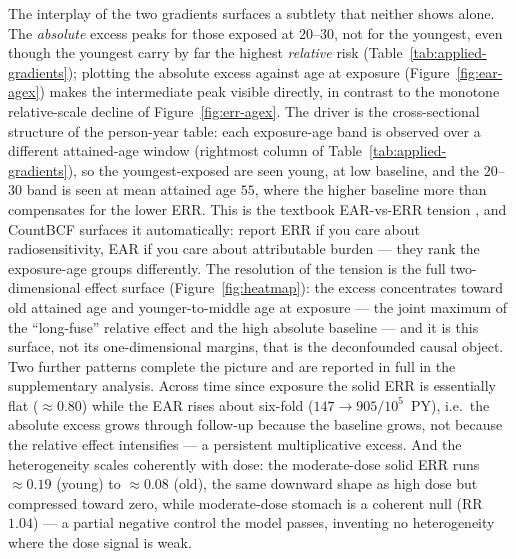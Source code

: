 \documentclass[11pt]{article}
\begin{document}
The interplay of the two gradients surfaces a subtlety that neither shows
alone. The \emph{absolute} excess peaks for those exposed at $20$--$30$, not
for the youngest, even though the youngest carry by far the highest
\emph{relative} risk (Table~\ref{tab:applied-gradients}); plotting the
absolute excess against age at exposure (Figure~\ref{fig:ear-agex}) makes the
intermediate peak visible directly, in contrast to the monotone relative-scale
decline of Figure~\ref{fig:err-agex}. The driver is the cross-sectional
structure of the person-year table: each exposure-age band is observed over a
different attained-age window (rightmost column of
Table~\ref{tab:applied-gradients}), so the youngest-exposed are seen young, at
low baseline, and the $20$--$30$ band is seen at mean attained age $55$, where
the higher baseline more than compensates for the lower ERR. This is the
textbook EAR-vs-ERR tension \citep{pierce2000}, and CountBCF surfaces it
automatically: report ERR if you care about radiosensitivity, EAR if you care
about attributable burden --- they rank the exposure-age groups differently.
The resolution of the tension is the full two-dimensional effect surface
(Figure~\ref{fig:heatmap}): the excess concentrates toward old attained age
and younger-to-middle age at exposure --- the joint maximum of the
``long-fuse'' relative effect and the high absolute baseline --- and it is
this surface, not its one-dimensional margins, that is the deconfounded causal
object. Two further patterns complete the picture and are reported in full in
the supplementary analysis. Across time since exposure the solid ERR is
essentially flat ($\approx 0.80$) while the EAR rises about six-fold
($147\to905/10^5$~PY), i.e.\ the absolute excess grows through follow-up
because the baseline grows, not because the relative effect intensifies --- a
persistent multiplicative excess. And the heterogeneity scales coherently with
dose: the moderate-dose solid ERR runs $\approx 0.19$ (young) to $\approx
0.08$ (old), the same downward shape as high dose but compressed toward zero,
while moderate-dose stomach is a coherent null (RR $1.04$) --- a partial
negative control the model passes, inventing no heterogeneity where the dose
signal is weak.
\end{document}
